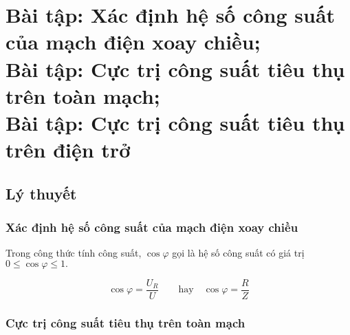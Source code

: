 
\chapter[Bài tập: Xác định hệ số công suất của mạch điện xoay chiều;\\Bài tập: Cực trị công suất tiêu thụ trên toàn mạch;\\Bài tập: Cực trị công suất tiêu thụ trên điện trở]{Bài tập: Xác định hệ số công suất của mạch điện xoay chiều;\\Bài tập: Cực trị công suất tiêu thụ trên toàn mạch;\\Bài tập: Cực trị công suất tiêu thụ trên điện trở}
\section{Lý thuyết}
\subsection{Xác định hệ số công suất của mạch điện xoay chiều}
Trong công thức tính công suất, $\cos \varphi$ gọi là hệ số công suất có giá trị $0\leq \cos \varphi \leq 1.$

$$\cos\varphi =\dfrac{U_R}{U}\qquad\textrm{hay}\quad \cos \varphi =\dfrac{R}{Z}$$
\subsection{Cực trị công suất tiêu thụ trên toàn mạch}

